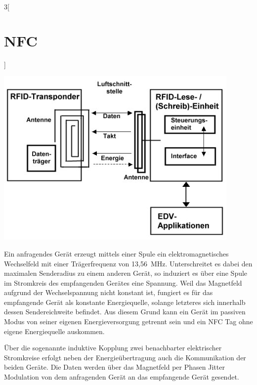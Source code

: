\begin{multicols}{3}[\section{NFC}]
\begin{Figure}
\includegraphics[width=\linewidth]{Kapitel/NFC/Grafiken/RFID.jpeg}
\label{fig:nfc.RFID}
\end{Figure}

Ein anfragendes Gerät erzeugt mittels einer Spule ein elektromagnetisches Wechselfeld mit einer Trägerfrequenz von 13,56~MHz. Unterschreitet es dabei den maximalen Senderadius zu einem anderen Gerät, so induziert es über eine Spule im Stromkreis des empfangenden Gerätes eine Spannung. Weil das Magnetfeld aufgrund der Wechselspannung nicht konstant ist, fungiert es für das empfangende Gerät als konstante Energiequelle, solange letzteres sich innerhalb dessen Sendereichweite befindet. Aus diesem Grund kann ein Gerät im passiven Modus von seiner eigenen Energieversorgung getrennt sein und ein NFC Tag ohne eigene Energiequelle auskommen.

Über die sogenannte induktive Kopplung zwei benachbarter elektrischer Stromkreise erfolgt neben der Energieübertragung auch die Kommunikation der beiden Geräte. Die Daten werden über das Magnetfeld per Phasen Jitter Modulation von dem anfragenden Gerät an das empfangende Gerät gesendet. 


\end{multicols}

